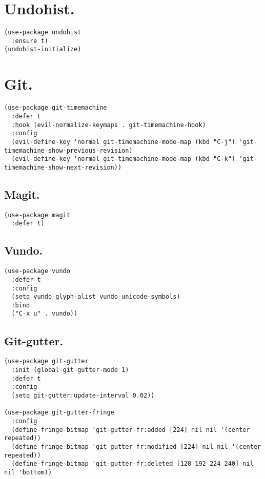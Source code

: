 \documentclass[11pt]{article}
\begin{document}
\section{Undohist.}
\label{sec:orgb7d6b16}
\begin{verbatim}
(use-package undohist
  :ensure t)
(undohist-initialize)
\end{verbatim}
\section{Git.}
\label{sec:org1feb1d7}
\begin{verbatim}
(use-package git-timemachine
  :defer t
  :hook (evil-normalize-keymaps . git-timemachine-hook)
  :config
  (evil-define-key 'normal git-timemachine-mode-map (kbd "C-j") 'git-timemachine-show-previous-revision)
  (evil-define-key 'normal git-timemachine-mode-map (kbd "C-k") 'git-timemachine-show-next-revision))
\end{verbatim}
\subsection{Magit.}
\label{sec:org27177bb}
\begin{verbatim}
(use-package magit
  :defer t)
\end{verbatim}
\subsection{Vundo.}
\label{sec:orgc31d72d}
\begin{verbatim}
(use-package vundo
  :defer t
  :config
  (setq vundo-glyph-alist vundo-unicode-symbols)
  :bind
  ("C-x u" . vundo))
\end{verbatim}
\subsection{Git-gutter.}
\label{sec:org87e87ca}
\begin{verbatim}
(use-package git-gutter
  :init (global-git-gutter-mode 1)
  :defer t
  :config
  (setq git-gutter:update-interval 0.02))

(use-package git-gutter-fringe
  :config
  (define-fringe-bitmap 'git-gutter-fr:added [224] nil nil '(center repeated))
  (define-fringe-bitmap 'git-gutter-fr:modified [224] nil nil '(center repeated))
  (define-fringe-bitmap 'git-gutter-fr:deleted [128 192 224 240] nil nil 'bottom))
\end{verbatim}
\end{document}

